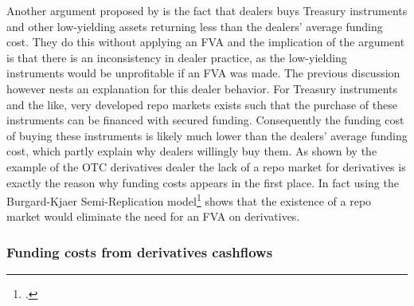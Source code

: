 \documentclass[../main.tex]{subfiles}
\begin{document}
        Another argument proposed by \cite{HullWhite2012FVA} is the fact that dealers buys Treasury instruments and other low-yielding assets returning less than the dealers' average funding cost. They do this without applying an FVA and the implication of the argument is that there is an inconsistency in dealer practice, as the low-yielding instruments would be unprofitable if an FVA was made. The previous discussion however nests an explanation for this dealer behavior. For Treasury instruments and the like, very developed repo markets exists such that the purchase of these instruments can be financed with secured funding. Consequently the funding cost of buying these instruments is likely much lower than the dealers' average funding cost, which partly explain why dealers willingly buy them. As shown by the example of the OTC derivatives dealer the lack of a repo market for derivatives is exactly the reason why funding costs appears in the first place. In fact \cite[Section~9.4.1]{Green2015XVA} using the Burgard-Kjaer Semi-Replication model\footcite{BurgardKjaer2013Funding} shows that the existence of a repo market would eliminate the need for an FVA on derivatives. 
        
    \subsubsection{Funding costs from derivatives cashflows}
\end{document}
